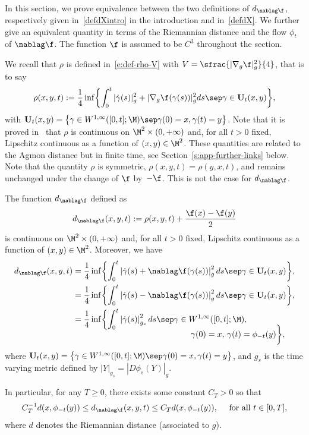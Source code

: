 In this section, we prove equivalence between the two definitions of $d_{\nablag \f}$, respectively given in~\eqref{defdXintro} in the introduction and in~\eqref{defdX}.
We further give an equivalent quantity in terms of the Riemannian distance and the flow $\phi_t$ of $\nablag\f$. The function $\f$ is assumed to be $C^{3}$ throughout the section.

We recall that $\rho$ is defined in~\eqref{e:def-rho-V} with $V= \sfrac{|\nabla_g \f|_g^2}{4}$, that is to say
\begin{equation}
\label{e:def-rho}
\rho(x,y,t):=\frac{1}{4} \inf \biggl\{ \int_0^t |\dot{\gamma}(s)|_g^2 +|\nabla_g\f(\gamma(s))|_g^2 ds\sep \gamma \in \mathbf{U}_t(x,y) \biggr\},
\end{equation}
with $\mathbf{U}_t(x,y)= \left\{ \gamma \in W^{1,\infty} ([0,t] ; \M )\sep\gamma(0)=x, \gamma(t)= y \right\}$.
Note that it is proved in~\cite[App.]{LY86} that $\rho$ is continuous on $\M^2 \times (0,+\infty)$ and, for all $t>0$ fixed, Lipschitz continuous as a function of $(x,y)\in \M^2$.
These quantities are related to the Agmon distance but in finite time, see Section~\ref{s:app-further-links} below. Note that the quantity $\rho$ is symmetric, $\rho(x,y,t) = \rho(y,x,t)$, and remains unchanged under the change of $\f$ by~$-\f$.
This is not the case for $d_{\nablag \f}$.

\begin{lemma}
\label{lmdist}
The function $d_{\nablag \f}$ defined as
\begin{equation}
\label{e:def-dX}
d_{\nablag \f}(x,y,t) := \rho(x,y,t)+\frac{\f(x)-\f(y)}{2}
\end{equation}
is continuous on $\M^2 \times (0,+\infty)$ and, for all $t>0$ fixed, Lipschitz continuous as a function of $(x,y)\in \M^2$. Moreover, we have
\begin{align}
\label{e:equiv-def-dx}
d_{\nablag \f}(x,y,t)&=\frac{1}{4} \inf \biggl\{ \int_0^t \left|\dot{\gamma}(s)+\nablag\f(\gamma(s))\right|_g^{2} ds\sep \gamma \in \mathbf{U}_t(x,y) \biggr\}, \\
\label{defdXappend}&=\frac{1}{4} \inf \biggl\{ \int_0^t \left|\dot{\gamma}(s)-\nablag\f(\gamma(s))\right|_g^{2} ds\sep \gamma \in \mathbf{U}_t(x,y) \biggr\},\\
\label{defdXbisappend}&=\frac{1}{4} \inf \biggl\{ \int_0^t \left|\dot{\gamma}(s)\right|_{g_s}^{2} ds\sep \gamma \in W^{1,\infty} ([0,t] ; \M ),\\[-10pt]
&\hspace*{5cm}\gamma(0)=x,\,\gamma(t)= \phi_{-t}(y) \biggr\},\notag
\end{align}
where $\mathbf{U}_t(x,y)= \left\{ \gamma \in W^{1,\infty} ([0,t] ; \M )\sep\gamma(0)=x, \gamma(t)= y \right\}$, and
$g_s$ is the time varying metric defined by $ \left|Y\right|_{g_s}= \left|D\phi_s(Y)\right|_{g}$.

In particular, for any $T\geq 0$, there exists some constant $C_T>0$ so that
\[
C_T^{-1}d(x,\phi_{-t}(y))\leq d_{\nablag \f}(x,y,t)\leq C_T d(x,\phi_{-t}(y)), \quad \text{ for all } t\in [0,T],
\]
where $d$ denotes the Riemannian distance (associated to $g$).
\end{lemma}

